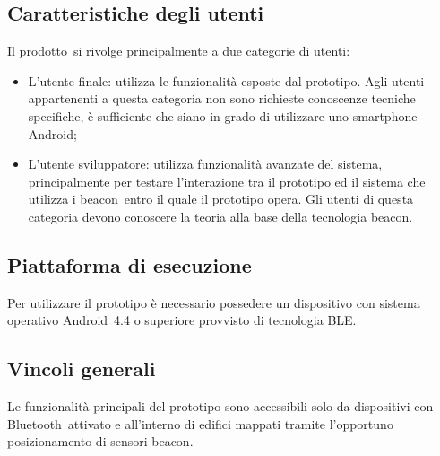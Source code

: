 \documentclass[../AnalisiDeiRequisiti.tex]{subfiles}
\begin{document}
	\subsection{Caratteristiche degli utenti} 
	Il prodotto\g\ si rivolge principalmente a due categorie di utenti:
	\begin{itemize}
		\item L'utente finale: utilizza le funzionalità esposte dal prototipo. Agli utenti appartenenti a questa categoria non sono richieste conoscenze tecniche specifiche, è sufficiente che siano in grado di utilizzare uno smartphone Android\g;
		\item L'utente sviluppatore: utilizza funzionalità avanzate del sistema, principalmente per testare l'interazione tra il prototipo ed il sistema che utilizza i beacon\g\ entro il quale il prototipo opera. Gli utenti di questa categoria devono conoscere la teoria alla base della tecnologia beacon\g.
	\end{itemize}
	
	\subsection{Piattaforma di esecuzione}
	Per utilizzare il prototipo è necessario possedere un dispositivo con sistema operativo Android\g\ 4.4 o superiore provvisto di tecnologia BLE\g.
	
	\subsection{Vincoli generali}
	Le funzionalità principali del prototipo sono accessibili solo da dispositivi con Bluetooth\g\ attivato e all'interno di edifici mappati tramite l'opportuno posizionamento di sensori beacon\g.
\end{document}
